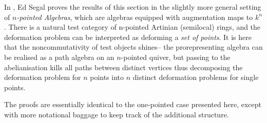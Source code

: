 \begin{remark}
    In \cite{segal__2008}, Ed Segal proves the results of this section in the
    slightly more general setting of \textit{\(n\)-pointed Algebras}, which are
    algebras equipped with augmentation maps to \(k^n\). There is a natural
    test category of n-pointed Artinian (semilocal) rings, and the deformation
    problem can be interpreted as deforming a \textit{set of points}. It is here
    that the noncommutativity of test objects shines-- the prorepresenting
    algebra can be realised as a path algebra on an \(n\)-pointed quiver, but
    passing to the abelianisation kills all paths between distinct vertices thus
    decomposing the deformation problem for \(n\) points into \(n\) distinct
    deformation problems for single points.

    The proofs are essentially identical to the one-pointed case presented here,
    except with more notational baggage to keep track of the additional
    structure.
\end{remark}

